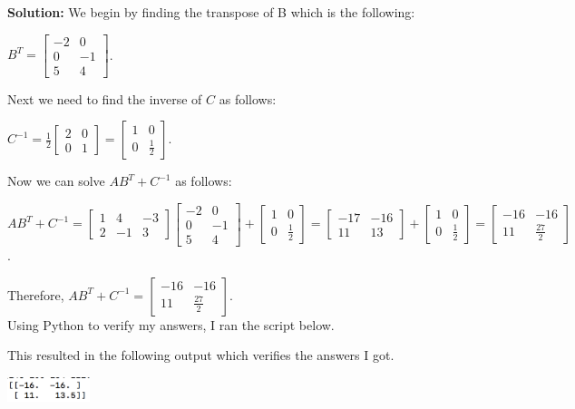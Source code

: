 \documentclass[a4paper]{article}
\begin{document}
\textbf{Solution:} We begin by finding the transpose of B which is the following:
\begin{center}
  $B^T =
\begin{bmatrix}
  -2 & 0\\
  0 & -1\\
  5 & 4
\end{bmatrix}$.
\end{center}

Next we need to find the inverse of $C$ as follows:
\begin{center}
  $C^{-1} = \frac{1}{2}
\begin{bmatrix}
  2 & 0\\
  0 & 1
\end{bmatrix} =
\begin{bmatrix}
  1 & 0\\
  0 & \frac{1}{2}
\end{bmatrix}$.
\end{center}

Now we can solve $AB^T+C^{-1}$ as follows:
\begin{center}
  $AB^T+C^{-1} =
  \begin{bmatrix}
    1 & 4 & -3\\
    2 & -1 & 3
  \end{bmatrix}
  \begin{bmatrix}
    -2 & 0\\
    0 & -1\\
    5 & 4
  \end{bmatrix} +
  \begin{bmatrix}
    1 & 0\\
    0 & \frac{1}{2}
  \end{bmatrix} =
  \begin{bmatrix}
    -17 & -16\\
    11 & 13
  \end{bmatrix} +
  \begin{bmatrix}
    1 & 0\\
    0 & \frac{1}{2}
  \end{bmatrix} =
  \begin{bmatrix}
    -16 & -16\\
    11 & \frac{27}{2}
  \end{bmatrix}$.
\end{center}

Therefore, $AB^T+C^{-1} =
\begin{bmatrix}
  -16 & -16\\
  11 & \frac{27}{2}
\end{bmatrix}$.\\
Using Python to verify my answers, I ran the script below.

This resulted in the following output which verifies the answers I got.\\
\begin{center}
  \includegraphics[width=0.18\textwidth]{ECMatrix.jpg}
\end{center}
\end{document}

